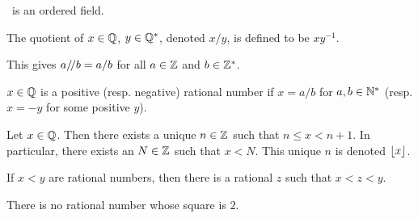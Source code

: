 \begin{theorem}[Algebra of \Q]
    \Q\ is an ordered field.
\end{theorem}

\begin{definition}
    The quotient of $x \in \mathbb{Q}$, $y \in \mathbb{Q}^*$, denoted $x / y$, is defined to
    be $x y^{-1}$.
\end{definition}
This gives $a /\!/ b = a / b$ for all $a \in \mathbb{Z}$ and $b \in \mathbb{Z}^*$.

\begin{definition}
    $x \in \mathbb{Q}$ is a positive (resp. negative) rational number if $x = a / b$
    for $a, b \in \mathbb{N}^*$ (resp. $x = -y$ for some positive $y$).
\end{definition}

\begin{proposition}
    Let $x \in \mathbb{Q}$.
    Then there exists a unique $n \in \mathbb{Z}$ such that $n \le x < n + 1$.
    In particular, there exists an $N \in \mathbb{Z}$ such that $x < N$.
    This unique $n$ is denoted $\floor{x}$.
\end{proposition}

\begin{proposition}
    If $x < y$ are rational numbers, then there is a rational $z$ such that
    $x < z < y$.
\end{proposition}

\begin{fact}
    There is no rational number whose square is $2$.
\end{fact}
